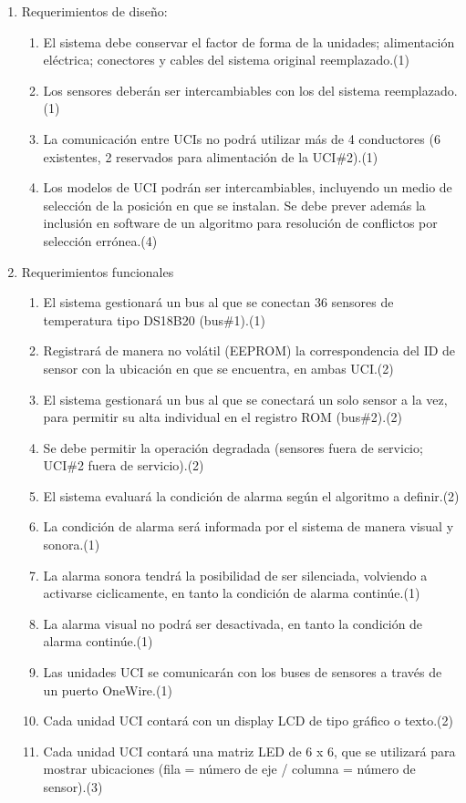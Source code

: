 \documentclass[
11pt, %
codirector, %
]{charter}
\begin{document}
\begin{enumerate}
	\item Requerimientos de diseño:
		\begin{enumerate}
			\item El sistema debe conservar el factor de forma de la unidades; alimentación eléctrica; conectores y cables del sistema original reemplazado.(1)
			\item Los sensores deberán ser intercambiables con los del sistema reemplazado.(1)
			\item La comunicación entre UCIs no podrá utilizar más de 4 conductores (6 existentes, 2 reservados para alimentación de la UCI\#2).(1)
			\item Los modelos de UCI podrán ser intercambiables, incluyendo un medio de selección de la posición en que se instalan. Se debe prever además la inclusión en software de un algoritmo para resolución de conflictos por selección errónea.(4) 
		\end{enumerate}
		
	\item Requerimientos funcionales
		\begin{enumerate}
		\item El sistema gestionará un bus al que se conectan 36 sensores de temperatura tipo DS18B20 (bus\#1).(1)
		\item Registrará de manera no volátil (EEPROM) la correspondencia del ID de sensor con la ubicación en que se encuentra, en ambas UCI.(2)
		\item El sistema gestionará un bus al que se conectará un solo sensor a la vez, para permitir su alta individual en el registro ROM (bus\#2).(2)
		\item Se debe permitir la operación degradada (sensores fuera de 				servicio; UCI\#2 fuera de servicio).(2)
		\item El sistema evaluará la condición de alarma según el 						algoritmo a definir.(2)
		\item La condición de alarma será informada por el sistema de 					manera visual y sonora.(1)
		\item La alarma sonora tendrá la posibilidad de ser silenciada, 				volviendo a activarse ciclicamente, en tanto la condición de alarma continúe.(1)
		\item La alarma visual no podrá ser desactivada, en tanto la 					condición de alarma continúe.(1)
		\item Las unidades UCI se comunicarán con los buses de sensores a través de un puerto OneWire.(1)
		\item Cada unidad UCI contará con un display LCD de tipo gráfico o texto.(2)
		\item Cada unidad UCI contará una matriz LED de 6 x 6, que se utilizará para mostrar ubicaciones (fila = número de eje / columna = número de sensor).(3)
		

\end{enumerate}
\end{enumerate}
\end{document}
